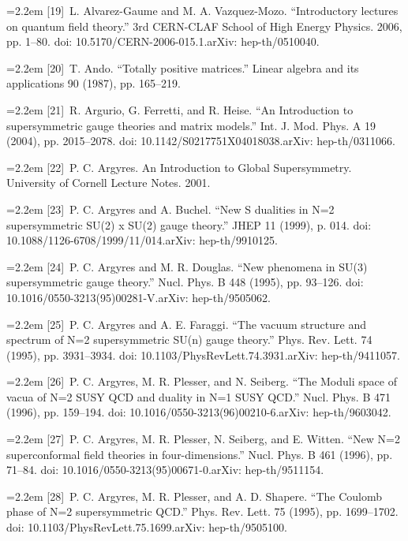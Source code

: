 \noindent\hangindent=2.2em [19]\ L. Alvarez-Gaume and M. A. Vazquez-Mozo. “Introductory lectures on quantum field theory.” 3rd CERN-CLAF School of High Energy Physics. 2006, pp. 1--80. doi: 10.5170/CERN-2006-015.1.arXiv: hep-th/0510040.\par
\noindent\hangindent=2.2em [20]\ T. Ando. “Totally positive matrices.” Linear algebra and its applications 90 (1987), pp. 165--219.\par
\noindent\hangindent=2.2em [21]\ R. Argurio, G. Ferretti, and R. Heise. “An Introduction to supersymmetric gauge theories and matrix models.” Int. J. Mod. Phys. A 19 (2004), pp. 2015--2078. doi: 10.1142/S0217751X04018038.arXiv: hep-th/0311066.\par
\noindent\hangindent=2.2em [22]\ P. C. Argyres. An Introduction to Global Supersymmetry. University of Cornell Lecture Notes. 2001.\par
\noindent\hangindent=2.2em [23]\ P. C. Argyres and A. Buchel. “New S dualities in N=2 supersymmetric SU(2) x SU(2) gauge theory.” JHEP 11 (1999), p. 014. doi: 10.1088/1126-6708/1999/11/014.arXiv: hep-th/9910125.\par
\noindent\hangindent=2.2em [24]\ P. C. Argyres and M. R. Douglas. “New phenomena in SU(3) supersymmetric gauge theory.” Nucl. Phys. B 448 (1995), pp. 93--126. doi: 10.1016/0550-3213(95)00281-V.arXiv: hep-th/9505062.\par
\noindent\hangindent=2.2em [25]\ P. C. Argyres and A. E. Faraggi. “The vacuum structure and spectrum of N=2 supersymmetric SU(n) gauge theory.” Phys. Rev. Lett. 74 (1995), pp. 3931--3934. doi: 10.1103/PhysRevLett.74.3931.arXiv: hep-th/9411057.\par
\noindent\hangindent=2.2em [26]\ P. C. Argyres, M. R. Plesser, and N. Seiberg. “The Moduli space of vacua of N=2 SUSY QCD and duality in N=1 SUSY QCD.” Nucl. Phys. B 471 (1996), pp. 159--194. doi: 10.1016/0550-3213(96)00210-6.arXiv: hep-th/9603042.\par
\noindent\hangindent=2.2em [27]\ P. C. Argyres, M. R. Plesser, N. Seiberg, and E. Witten. “New N=2 superconformal field theories in four-dimensions.” Nucl. Phys. B 461 (1996), pp. 71--84. doi: 10.1016/0550-3213(95)00671-0.arXiv: hep-th/9511154.\par
\noindent\hangindent=2.2em [28]\ P. C. Argyres, M. R. Plesser, and A. D. Shapere. “The Coulomb phase of N=2 supersymmetric QCD.” Phys. Rev. Lett. 75 (1995), pp. 1699--1702. doi: 10.1103/PhysRevLett.75.1699.arXiv: hep-th/9505100.\par
